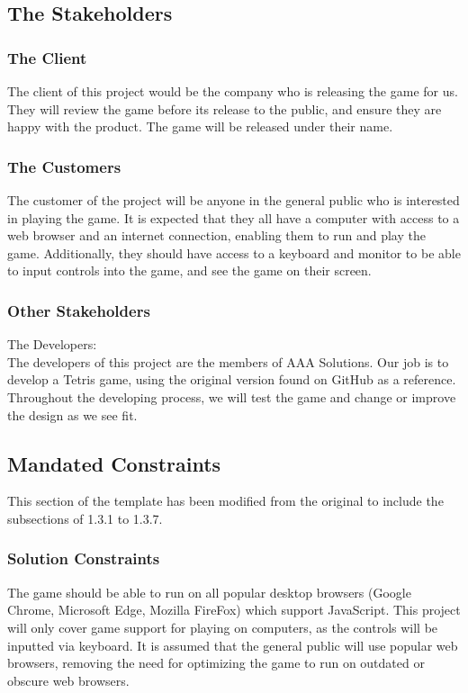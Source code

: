 \documentclass[12pt, titlepage]{article}
\begin{document}
\subsection{The Stakeholders}

\subsubsection{The Client}
The client of this project would be the company who is releasing the game for us. They will review the game before its release to the public, and ensure they are happy with the product. The game will be released under their name.
\subsubsection{The Customers}

The customer of the project will be anyone in the general public who is interested in playing the game. It is expected that they all have a computer with access to a web browser and an internet connection, enabling them to run and play the game. Additionally, they should have access to a keyboard and monitor to be able to input controls into the game, and see the game on their screen.

\subsubsection{Other Stakeholders}

The Developers:\\
The developers of this project are the members of AAA Solutions. Our job is to develop a Tetris game, using the original version found on GitHub as a reference. Throughout the developing process, we will test the game and change or improve the design as we see fit.

\subsection{Mandated Constraints}

This section of the template has been modified from the original to include the subsections of 1.3.1 to 1.3.7.

\subsubsection{Solution Constraints}
The game should be able to run on all popular desktop browsers (Google Chrome, Microsoft Edge, Mozilla FireFox) which support JavaScript. This project will only cover game support for playing on computers, as the controls will be inputted via keyboard. It is assumed that the general public will use popular web browsers, removing the need for optimizing the game to run on outdated or obscure web browsers.
\end{document}
